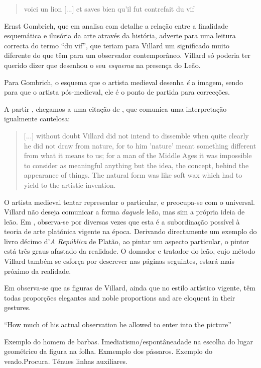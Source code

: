 \documentclass{article}
\begin{document}
\begin{quote}
  voici un lion [...] et saves bien qu'il fut contrefait du vif
\end{quote}

Ernst Gombrich, que em \cite{gombrich} analisa com detalhe a relação
entre a finalidade esquemática e ilusória da arte através da história,
adverte para uma leitura correcta do termo ``du vif'', que teriam para
Villard um significado muito diferente do que têm para um observador
contemporâneo. Villard só poderia ter querido dizer que desenhou o seu
\emph{esquema} na presença do Leão. \cite[p. 68]{gombrich}

Para Gombrich, o esquema que o artista medieval desenha \emph{é} a
imagem, sendo para que o artista pós-medieval, ele é o ponto de
partida para correcções. \cite[p. 68]{gombrich}

A partir \cite{teresa}, chegamos a uma citação de \cite{schlosser},
que comunica uma interpretação igualmente cautelosa:
 \begin{quote}
  [...] without doubt Villard did not intend to dissemble when quite
  clearly he did not draw from nature, for to him 'nature' meant
  something different from what it means to us; for a man of the
  Middle Ages it was impossible to consider as meaningful anything but
  the idea, the concept, behind the appearance of things. The natural
  form was like soft wax which had to yield to the artistic invention.
 \end{quote}

O artista medieval tentar representar o particular, e preocupa-se com
o universal. Villard não deseja comunicar a forma \emph{daquele} leão,
mas sim a própria ideia de leão. Em \cite{gombrich}, observa-se por
diversas vezes que esta é a subordinação possível à teoria de arte
platónica vigente na época. Derivando directamente um exemplo do livro
décimo d'\emph{A República} de Platão, ao pintar um aspecto
particular, o pintor está três graus afastado da realidade. O domador
e tratador do leão, cujo método Villard também se esforça por
descrever nas páginas seguintes, estará mais próximo da
realidade.

Em \cite{teresa} observa-se que as figuras de Villard, ainda que no
estilo artístico vigente, têm todas proporções elegantes and noble
proportions and are eloquent in their gestures.

\cite{gombrich} ``How much of his actual observation he allowed to
enter into the picture''

Exemplo do homem de barbas. Imediatismo/espontâneadade na escolha do
lugar geométrico da figura na folha. Exmemplo dos pássaros. Exemplo do
veado.Procura. Ténues linhas auxiliares.
\end{document}
